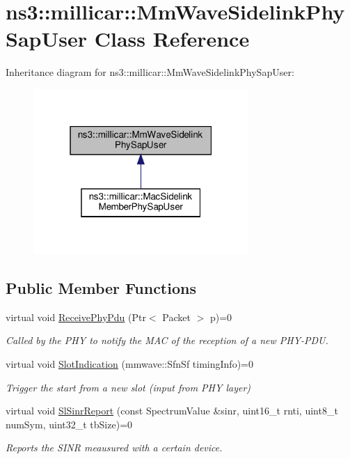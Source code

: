 \hypertarget{classns3_1_1millicar_1_1MmWaveSidelinkPhySapUser}{}\section{ns3\+:\+:millicar\+:\+:Mm\+Wave\+Sidelink\+Phy\+Sap\+User Class Reference}
\label{classns3_1_1millicar_1_1MmWaveSidelinkPhySapUser}


Inheritance diagram for ns3\+:\+:millicar\+:\+:Mm\+Wave\+Sidelink\+Phy\+Sap\+User\+:
\nopagebreak
\begin{figure}[H]
\begin{center}
\leavevmode
\includegraphics[width=232pt]{classns3_1_1millicar_1_1MmWaveSidelinkPhySapUser__inherit__graph}
\end{center}
\end{figure}
\subsection*{Public Member Functions}
\begin{DoxyCompactItemize}
\item 
virtual void \hyperlink{classns3_1_1millicar_1_1MmWaveSidelinkPhySapUser_ac0e4d40ace55e47cb3fb54d09c80fe06}{Receive\+Phy\+Pdu} (Ptr$<$ Packet $>$ p)=0
\begin{DoxyCompactList}\small\item\em Called by the P\+HY to notify the M\+AC of the reception of a new P\+H\+Y-\/\+P\+DU. \end{DoxyCompactList}\item 
virtual void \hyperlink{classns3_1_1millicar_1_1MmWaveSidelinkPhySapUser_a237ec6c8c7496a3e021d22393ba7fc61}{Slot\+Indication} (mmwave\+::\+Sfn\+Sf timing\+Info)=0
\begin{DoxyCompactList}\small\item\em Trigger the start from a new slot (input from P\+HY layer) \end{DoxyCompactList}\item 
virtual void \hyperlink{classns3_1_1millicar_1_1MmWaveSidelinkPhySapUser_aedb96411ce5a46589df517b1aa272d97}{Sl\+Sinr\+Report} (const Spectrum\+Value \&sinr, uint16\+\_\+t rnti, uint8\+\_\+t num\+Sym, uint32\+\_\+t tb\+Size)=0
\begin{DoxyCompactList}\small\item\em Reports the S\+I\+NR meausured with a certain device. \end{DoxyCompactList}\end{DoxyCompactItemize}


